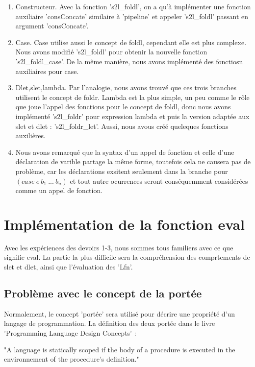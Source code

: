 \documentclass{article}
\begin{document}
\begin{enumerate}
  \item Constructeur. Avec la fonction 's2l\_foldl', on a 
  qu'à implémenter une fonction auxiliaire 'consConcate' similaire à 'pipeline'
  et appeler 's2l\_foldl' passant en argument 'consConcate'.
  
  
  \item Case. Case utilise aussi le concept de foldl, cependant
  elle est plus complexe. Nous avons modifié 's2l\_foldl' pour
  obtenir la nouvelle fonction 's2l\_foldl\_case'. De la même manière,
  nous avons implémenté des fonctiosn auxiliaires pour case. 

  
  \item Dlet,slet,lambda. Par l'analogie, nous avons trouvé que ces trois branches utilisent le concept de foldr.
  Lambda est la plus simple, un peu comme le rôle que joue l'appel
  des fonctions pour le concept de foldl, donc nous avons implémenté
  's2l\_foldr' pour expression lambda et puis la version adaptée aux slet
  et dlet : 's2l\_foldr\_let'. Aussi, nous avous créé queleques fonctions auxilières.

  
  \item Nous avons remarqué
que la syntax d'un appel de fonction et celle d'une déclaration de varible partage la même forme,
toutefois cela ne causera pas de problème, car les déclarations exsitent seulement dans la branche
pour $(case\ e\ b_1\ ... \ b_n)$ et tout autre ocurrences seront conséquemment considérées comme
un appel de fonction.

\end{enumerate}

\section{Implémentation de la fonction eval}
Avec les expériences des devoirs 1-3, nous sommes tous familiers avec
ce que signifie eval. La partie la plus difficile sera la compréhension des comprtements de
slet et dlet, ainsi que l'évaluation des 'Lfn'.
\subsection{Problème avec le concept de la portée}
Normalement, le concept 'portée' sera utilisé pour décrire une propriété d'un 
langage de programmation. La définition des deux portée dans le livre 'Programming Language Design
Concepts' :

   "A language is statically scoped if the body of a procedure is executed in the environnement of the procedure's definition."
\end{document}
